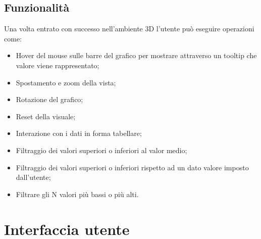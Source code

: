 \newpage


\subsection{Funzionalità}
Una volta entrato con successo nell'ambiente 3D l'utente può eseguire operazioni come:
\begin{itemize}
    \item Hover del mouse sulle barre del grafico per mostrare attraverso un tooltip che valore viene rappresentato;
    \item Spostamento e zoom della vista;
    \item Rotazione del grafico;
    \item Reset della visuale;
    \item Interazione con i dati in forma tabellare;
    \item Filtraggio dei valori superiori o inferiori al valor medio;
    \item Filtraggio dei valori superiori o inferiori rispetto ad un dato valore imposto dall'utente;
    \item Filtrare gli N valori più bassi o più alti.
\end{itemize}

\section{Interfaccia utente}

